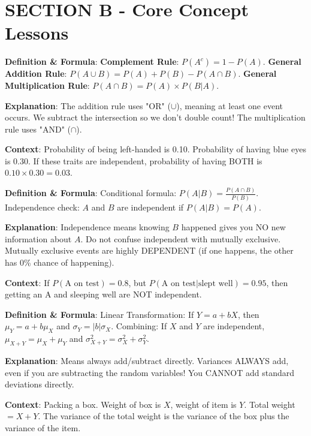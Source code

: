 \section{SECTION B - Core Concept Lessons}

\begin{lessonbox}
\textbf{Definition \& Formula}: 
\textbf{Complement Rule}: $P(A^c) = 1 - P(A)$.
\textbf{General Addition Rule}: $P(A \cup B) = P(A) + P(B) - P(A \cap B)$.
\textbf{General Multiplication Rule}: $P(A \cap B) = P(A) \times P(B | A)$.

\textbf{Explanation}: The addition rule uses "OR" ($\cup$), meaning at least one event occurs. We subtract the intersection so we don't double count! The multiplication rule uses "AND" ($\cap$).

\textbf{Context}: Probability of being left-handed is 0.10. Probability of having blue eyes is 0.30. If these traits are independent, probability of having BOTH is $0.10 \times 0.30 = 0.03$.
\end{lessonbox}

\begin{lessonbox}
\textbf{Definition \& Formula}: 
Conditional formula: $P(A | B) = \frac{P(A \cap B)}{P(B)}$.
Independence check: $A$ and $B$ are independent if $P(A | B) = P(A)$.

\textbf{Explanation}: Independence means knowing $B$ happened gives you NO new information about $A$. Do not confuse independent with mutually exclusive. Mutually exclusive events are highly DEPENDENT (if one happens, the other has 0\% chance of happening).

\textbf{Context}: If $P(\text{A on test}) = 0.8$, but $P(\text{A on test} | \text{slept well}) = 0.95$, then getting an A and sleeping well are NOT independent.
\end{lessonbox}

\begin{lessonbox}
\textbf{Definition \& Formula}: 
Linear Transformation: If $Y = a + bX$, then $\mu_Y = a + b\mu_X$ and $\sigma_Y = |b|\sigma_X$.
Combining: If $X$ and $Y$ are independent, $\mu_{X+Y} = \mu_X + \mu_Y$ and $\sigma^2_{X+Y} = \sigma^2_X + \sigma^2_Y$.

\textbf{Explanation}: Means always add/subtract directly. Variances ALWAYS add, even if you are subtracting the random variables! You CANNOT add standard deviations directly.

\textbf{Context}: Packing a box. Weight of box is $X$, weight of item is $Y$. Total weight $= X+Y$. The variance of the total weight is the variance of the box plus the variance of the item.
\end{lessonbox}

